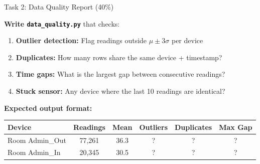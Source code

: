 \documentclass[aspectratio=169,11pt]{beamer}
\begin{document}
\begin{frame}[fragile]{Task 2: Data Quality Report (40\%)}

    \vspace{0.2cm}
    \textbf{Write \texttt{data\_quality.py}} that checks:
    \begin{enumerate}
        \item \textbf{Outlier detection:} Flag readings outside $\mu \pm 3\sigma$ per device
        \item \textbf{Duplicates:} How many rows share the same device + timestamp?
        \item \textbf{Time gaps:} What is the largest gap between consecutive readings?
        \item \textbf{Stuck sensor:} Any device where the last 10 readings are identical?
    \end{enumerate}

    \vspace{0.1cm}
    \textbf{Expected output format:}
    \footnotesize
    \begin{center}
    \begin{tabular}{lccccc}
        \toprule
        \textbf{Device} & \textbf{Readings} & \textbf{Mean} & \textbf{Outliers} & \textbf{Duplicates} & \textbf{Max Gap} \\
        \midrule
        Room Admin\_Out & 77,261 & 36.3 & ? & ? & ? \\
        Room Admin\_In & 20,345 & 30.5 & ? & ? & ? \\
        \bottomrule
    \end{tabular}
    \end{center}
    \normalsize

    \vspace{0.1cm}
\end{frame}
\end{document}
